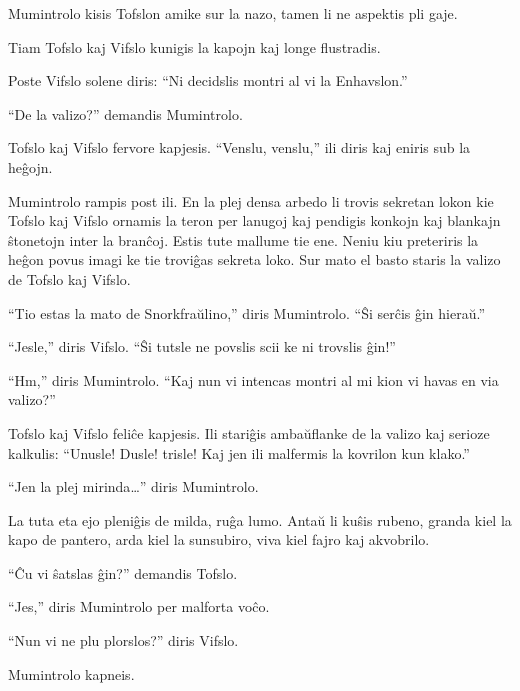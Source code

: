 Mumintrolo kisis Tofslon amike sur la nazo, tamen li ne aspektis pli gaje.

Tiam Tofslo kaj Vifslo kunigis la kapojn kaj longe flustradis.

Poste Vifslo solene diris: ``Ni decidslis montri al vi la Enhavslon.''

``De la valizo?'' demandis Mumintrolo.

Tofslo kaj Vifslo fervore kapjesis. ``Venslu, venslu,'' ili diris kaj eniris sub la heĝojn.

Mumintrolo rampis post ili. En la plej densa arbedo li trovis sekretan lokon kie Tofslo kaj Vifslo ornamis la teron per lanugoj kaj pendigis konkojn kaj blankajn ŝtonetojn inter la branĉoj. Estis tute mallume tie ene. Neniu kiu preteriris la heĝon povus imagi ke tie troviĝas sekreta loko. Sur mato el basto staris la valizo de Tofslo kaj Vifslo.

``Tio estas la mato de Snorkfraŭlino,'' diris Mumintrolo. ``Ŝi serĉis ĝin hieraŭ.''

``Jesle,'' diris Vifslo. ``Ŝi tutsle ne povslis scii ke ni trovslis ĝin!''

``Hm,'' diris Mumintrolo. ``Kaj nun vi intencas montri al mi kion vi havas en via valizo?''

Tofslo kaj Vifslo feliĉe kapjesis. Ili stariĝis ambaŭflanke de la valizo kaj serioze kalkulis: ``Unusle! Dusle! trisle! Kaj jen ili malfermis la kovrilon kun klako.''

``Jen la plej mirinda{\ldots}'' diris Mumintrolo.

La tuta eta ejo pleniĝis de milda, ruĝa lumo. Antaŭ li kuŝis rubeno, granda kiel la kapo de pantero, arda kiel la sunsubiro, viva kiel fajro kaj akvobrilo.

``Ĉu vi ŝatslas ĝin?'' demandis Tofslo.

``Jes,'' diris Mumintrolo per malforta voĉo.

``Nun vi ne plu plorslos?'' diris Vifslo.

Mumintrolo kapneis.

